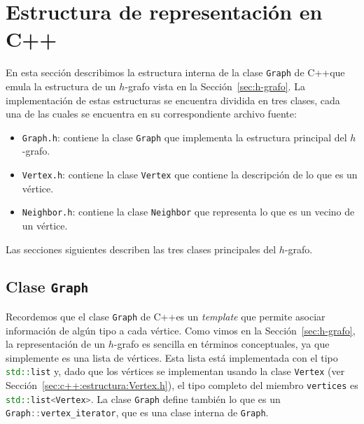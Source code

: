 \documentclass[%
    a4paper,%
    fontsize=12pt,%
    DIV=12,
    twoside,%
    openright,%
    titlepage=true,%
    headsepline,%
    toc=bibliography,%
    parskip=half,%
    cleardoublepage=empty,%
    headings=big,%
]{scrbook}
\makeatletter
\newcommand{\Code}[1]{\lstinline[basicstyle={\ttfamily}]@#1@}
\newcommand{\CPPCode}[1]{\lstinline[language=C++,basicstyle={\ttfamily}]@#1@}
\newcommand{\Graph}{\CPPCode{Graph}\xspace}
\DeclareRobustCommand{\CPP}{C\nolinebreak[4]\hspace{-.05em}\raisebox{.4ex}{\relsize{-3}\textbf{++}}\xspace}
\def\CPP{C++}%
\makeatother
\begin{document}
% 
% 
% 
% 
% 
% 





\section{Estructura de representación en \CPP}
\label{sec:c++:estructura}

En esta sección describimos la estructura interna de la clase \Graph de \CPP que emula la estructura de un $h$-grafo vista en la Sección~\ref{sec:h-grafo}.  La implementación de estas estructuras se encuentra dividida en tres clases, cada una de las cuales se encuentra en su correspondiente archivo fuente:
\begin{itemize}
  \item \Code{Graph.h}: contiene la clase \CPPCode{Graph} que implementa la estructura principal del $h$-grafo.
  \item \Code{Vertex.h}: contiene la clase \CPPCode{Vertex} que contiene la descripción de lo que es un vértice.
  \item \Code{Neighbor.h}: contiene la clase \CPPCode{Neighbor} que representa lo que es un vecino de un vértice.
\end{itemize}
Las secciones siguientes describen las tres clases principales del $h$-grafo.

\subsection{Clase \texorpdfstring{\protect\CPPCode{Graph}}{Graph}}
\label{sec:c++:estructura:Graph.h}

Recordemos que el clase \Graph de \CPP es un \emph{template} que permite asociar información de algún tipo a cada vértice.  Como vimos en la Sección~\ref{sec:h-grafo}, la representación de un $h$-grafo es sencilla en términos conceptuales, ya que simplemente es una lista de vértices.  Esta lista está implementada con el tipo \CPPCode{std::list} y, dado que los vértices se implementan usando la clase \CPPCode{Vertex} (ver Sección~\ref{sec:c++:estructura:Vertex.h}), el tipo completo del miembro \CPPCode{vertices} es \CPPCode{std::list<Vertex>}.  La clase \Graph define también lo que es un \CPPCode{Graph::vertex_iterator}, que es una clase interna de \Graph.  
\end{document}
